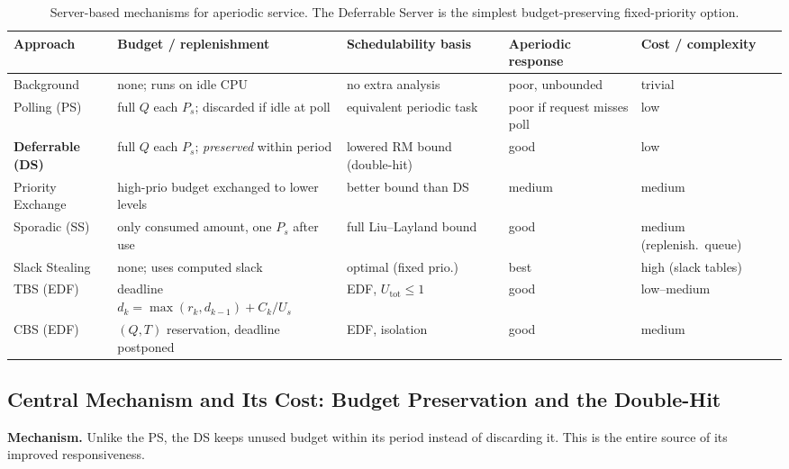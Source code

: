 \documentclass[conference]{IEEEtran}
\begin{document}
\begin{table}[t]
\caption{Server-based mechanisms for aperiodic service. The Deferrable Server is the simplest budget-preserving fixed-priority option.}
\label{tab:server_comparison}
\centering
\renewcommand{\arraystretch}{1.25}
\begin{tabular}{p{2.3cm} p{4.0cm} p{3.2cm} p{2.6cm} p{2.3cm}}
\toprule
\textbf{Approach} & \textbf{Budget / replenishment} & \textbf{Schedulability basis} & \textbf{Aperiodic response} & \textbf{Cost / complexity} \\
\midrule
Background        & none; runs on idle CPU & no extra analysis & poor, unbounded & trivial \\
\midrule
Polling (PS)      & full $Q$ each $P_s$; discarded if idle at poll & equivalent periodic task & poor if request misses poll & low \\
\midrule
\textbf{Deferrable (DS)} & full $Q$ each $P_s$; \emph{preserved} within period & lowered RM bound (double-hit) & good & low \\
\midrule
Priority Exchange & high-prio budget exchanged to lower levels & better bound than DS & medium & medium \\
\midrule
Sporadic (SS)     & only consumed amount, one $P_s$ after use & full Liu--Layland bound & good & medium (replenish.\ queue) \\
\midrule
Slack Stealing    & none; uses computed slack & optimal (fixed prio.) & best & high (slack tables) \\
\midrule
TBS (EDF)         & deadline $d_k=\max(r_k,d_{k-1})+C_k/U_s$ & EDF, $U_{\text{tot}}\le 1$ & good & low--medium \\
\midrule
CBS (EDF)         & $(Q,T)$ reservation, deadline postponed & EDF, isolation & good & medium \\
\bottomrule
\end{tabular}
\end{table}

\subsection{Central Mechanism and Its Cost: Budget Preservation and the Double-Hit}
\label{sec:doublehit}

\noindent\textbf{Mechanism.} Unlike the PS, the DS keeps unused budget within
its period instead of discarding it. This is the entire source of its improved
responsiveness.
\end{document}
